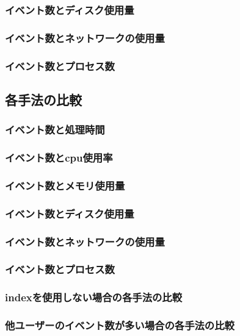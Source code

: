 \documentclass[../../main]{subfiles}
\begin{document}
    \subsubsection{イベント数とディスク使用量}\label{subsubsec:result-paging-last-async-disk}
    \subsubsection{イベント数とネットワークの使用量}\label{subsubsec:result-paging-last-async-network}
    \subsubsection{イベント数とプロセス数}\label{subsubsec:result-paging-last-async-process}

    \subsection{各手法の比較}\label{subsec:result-cpu}
    \subsubsection{イベント数と処理時間}\label{subsubsec:result-time}
    \subsubsection{イベント数とcpu使用率}\label{subsubsec:result-cpu}
    \subsubsection{イベント数とメモリ使用量}\label{subsubsec:result-memory}
    \subsubsection{イベント数とディスク使用量}\label{subsubsec:result-disk}
    \subsubsection{イベント数とネットワークの使用量}\label{subsubsec:result-network}
    \subsubsection{イベント数とプロセス数}\label{subsubsec:result-process}
    \subsubsection{indexを使用しない場合の各手法の比較}\label{subsubsec:result-without-index}
    \subsubsection{他ユーザーのイベント数が多い場合の各手法の比較}\label{subsubsec:result-other-user}

    \clearpage
\end{document}
